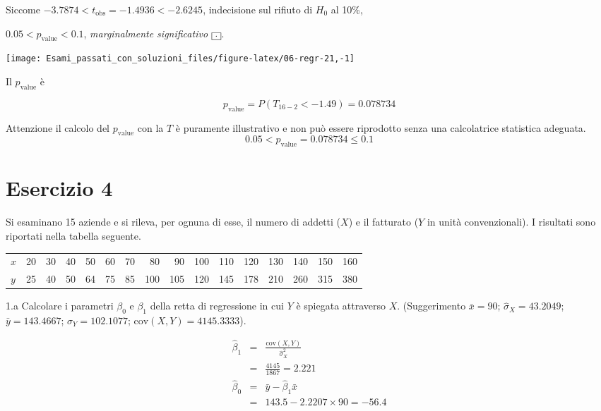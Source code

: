 \documentclass[
  11pt,
]{book}
\theoremstyle{mytheoremstyle}
\theoremstyle{mydefstyle}
\newenvironment{sol}
  {
  \begin{tcolorbox}[enhanced,breakable,arc=0.1mm,boxrule=1pt,colback=white,colframe=iblue,
  title=\bf \fontfamily{lmss}\selectfont \hspace{.5 cm} Soluzione,drop fuzzy shadow]

}{
\end{tcolorbox}
  }
\begin{document}
\begin{sol}
Siccome \(-3.7874<t_\text{obs}=-1.4936<-2.6245\), indecisione sul rifiuto di \(H_0\) al 10\%,

\(0.05<p_\text{value}<0.1\), \emph{marginalmente significativo} \(\fbox{.}\).

\begin{center}\texttt{[image: Esami\_passati\_con\_soluzioni\_files/figure-latex/06-regr-21,-1]} \end{center}

Il \(p_{\text{value}}\) è

\[ p_{\text{value}} = P(T_{16-2}<-1.49)=0.078734 \]

Attenzione il calcolo del \(p_\text{value}\) con la \(T\) è puramente illustrativo e non può essere riprodotto senza una calcolatrice statistica adeguata.\[
 0.05 < p_\text{value}= 0.078734 \leq 0.1 
\]

\end{sol}

\section{Esercizio 4}\label{esercizio-4-2}

Si esaminano 15 aziende e si rileva, per ognuna di esse,
il numero di addetti (\(X\)) e il fatturato (\(Y\) in unità
convenzionali).
I risultati sono riportati nella tabella seguente.

\begin{table}[H]
\centering
\begin{tabular}{lrrrrrrrrrrrrrrr}
\toprule
$x$ & 20 & 30 & 40 & 50 & 60 & 70 & 80 & 90 & 100 & 110 & 120 & 130 & 140 & 150 & 160\\
$y$ & 25 & 40 & 50 & 64 & 75 & 85 & 100 & 105 & 120 & 145 & 178 & 210 & 260 & 315 & 380\\
\bottomrule
\end{tabular}
\end{table}

1.a Calcolare i parametri \(\beta_{0}\) e \(\beta_{1}\)
della retta di regressione in cui \(Y\) è spiegata attraverso \(X\).
(Suggerimento \(\bar{x} = 90\); \(\hat\sigma_{X} = 43.2049\);
\(\bar{y} = 143.4667\); \(\hat\sigma_{Y} = 102.1077\); \(\text{cov}(X,Y)= 4145.3333\)).

\begin{sol}
\begin{eqnarray*}
       \hat\beta_1 &=& \frac{\text{cov}(X,Y)}{\hat\sigma_X^2} \\
            &=& \frac{ 4145 }{ 1867 }  =  2.221 \\
      \hat\beta_0 &=& \bar y - \hat\beta_1 \bar x\\
          &=&  143.5 - 2.2207 \times  90 = -56.4 
      \end{eqnarray*}

\end{sol}
\end{document}
